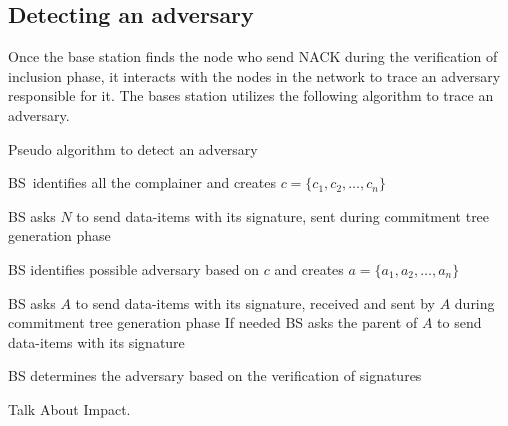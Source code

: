 	\subsection{Detecting an adversary}
		Once the base station finds the node who send NACK during the verification of inclusion phase, it interacts with the nodes in the network to trace an adversary responsible for it. 
		The bases station utilizes the following algorithm to trace an adversary.
		\begin{algorithm}
			\caption{Pseudo algorithm to detect an adversary}
			\label{algo:detect-an-adversary}
			\begin{algorithmic}[1]

				\STATE BS\ identifies all the complainer and creates $c = \{c_{1}, c_{2}, \dotsc, c_{n}\}$

					\STATE BS asks $N$ to send data-items with its signature, sent during commitment tree generation phase
				
				\ENDFOR

				\STATE BS identifies possible adversary based on $c$ and creates $a = \{a_{1},a_{2},\dotsc,a_{n}\}$


					\STATE BS asks $A$ to send data-items with its signature, received and sent by $A$ during commitment tree generation phase
					\STATE If needed BS  asks the parent of $A$ to send data-items with its signature
		
				\ENDFOR

				\STATE BS determines the adversary based on the verification of signatures

			\end{algorithmic}
		\end{algorithm}

		Talk About Impact.